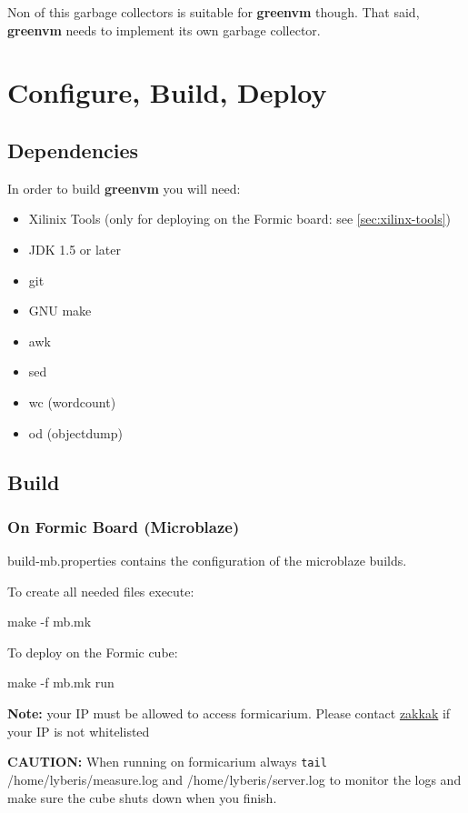 \documentclass[
a4paper,
12pt,
]{report}
\newcommand{\gvm}{{\fontfamily{fco}\selectfont\textbf{\color{g}green\color{v}vm}}\xspace}
\begin{document}
Non of this garbage collectors is suitable for \gvm though. That said,
\gvm needs to implement its own garbage collector. 

\chapter{Configure, Build, Deploy}

\section{Dependencies}

In order to build \gvm you will need:

\begin{itemize}
\item Xilinix Tools (only for deploying on the Formic board: see
  \autoref{sec:xilinx-tools})
\item JDK 1.5 or later
\item git
\item GNU make
\item awk
\item sed
\item wc (wordcount)
\item od (objectdump)
\end{itemize}

\section{Build}

\subsection{On Formic Board (Microblaze)}
build-mb.properties contains the configuration of the microblaze
builds.

To create all needed files execute:
\begin{bash}
make -f mb.mk
\end{bash}


To deploy on the Formic cube:
\begin{bash}
make -f mb.mk run
\end{bash}

\textbf{Note:} your IP must be allowed to access formicarium. Please
contact \href{mailto:zakkak@ics.forth.gr}{zakkak} if your IP is not
whitelisted

\textbf{\color{red}CAUTION:} When running on formicarium always
\verb!tail! /home/lyberis/measure.log and /home/lyberis/server.log to
monitor the logs and make sure the cube shuts down when you finish.
\end{document}

